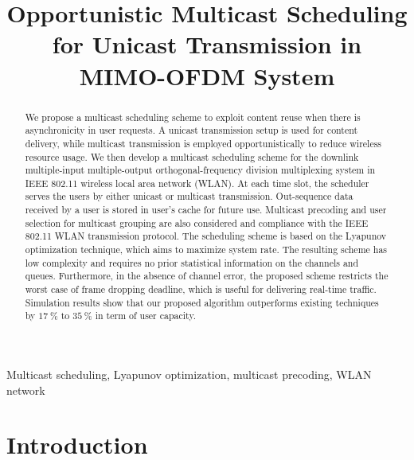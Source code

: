 \documentclass[conference]{IEEEtran}
\newcommand{\0}{\vect{0}}
\newcommand{\1}{\vect{1}}
\begin{document}
\title{Opportunistic Multicast Scheduling for Unicast Transmission in MIMO-OFDM System}

\author{
}


\maketitle

\begin{abstract}We propose a multicast scheduling scheme to exploit content reuse when there is asynchronicity in user requests. A unicast transmission setup is used for content delivery, while multicast transmission is employed opportunistically to reduce wireless resource usage. We then develop a multicast scheduling scheme for the downlink multiple-input multiple-output orthogonal-frequency division multiplexing system in IEEE 802.11 wireless local area network (WLAN). At each time slot, the scheduler serves the users by either unicast or multicast transmission. Out-sequence data received by a user is stored in user's cache for future use. Multicast precoding and user selection for multicast grouping are also considered and compliance with the IEEE 802.11 WLAN transmission protocol. The scheduling scheme is based on the Lyapunov optimization technique, which aims to maximize system rate. The resulting scheme has low complexity and requires no prior statistical information on the channels and queues. Furthermore, in the absence of channel error, the proposed scheme restricts the worst case of frame dropping deadline, which is useful for delivering real-time traffic. Simulation results show that our proposed algorithm outperforms existing techniques by $17~\%$ to $35~\%$ in term of user capacity.

\end{abstract}
\begin{keywords}
Multicast scheduling, Lyapunov optimization, multicast precoding, WLAN network
\end{keywords}

\section{Introduction}\label{sec:intro}
\end{document}

